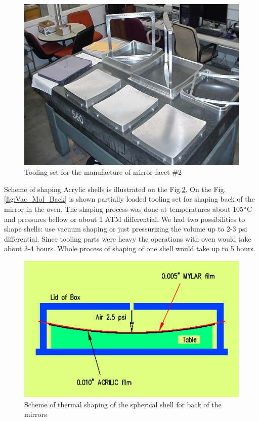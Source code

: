 \begin{figure}[h]
    \centering
    \includegraphics[width=1.0\linewidth]{images/Tool_on_tbl.jpg}
    \caption{Tooling set for the manufacture of mirror facet \#2}
    \label{fig:Tooling}
\end{figure}

\indent Scheme of shaping Acrylic shells is illustrated on the  Fig.\ref{fig:Shaping_new}. On the Fig.\ref{fig:Vac_Mol_Back} is shown partially loaded tooling set for shaping back of the mirror in the oven. The shaping process was done at temperatures about 105$\degree$C and pressures bellow or about 1 ATM differential. We had two possibilities to shape shells: use vacuum shaping or just pressurizing the volume up to 2-3 psi differential. Since tooling parts were heavy the operations with oven would take about 3-4 hours. Whole process of shaping of one shell would take up to 5 hours.

\begin{figure}[h]
    \centering
    \includegraphics[width=1.0\linewidth]{images/Shaping_new.png}
    \caption{Scheme of thermal shaping of the spherical shell for back of the mirrors}
    \label{fig:Shaping_new}
\end{figure}

